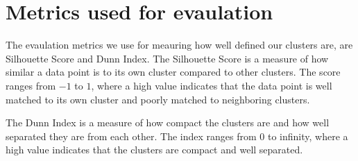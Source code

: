 \section{Metrics used for evaulation}

The evaulation metrics we use for meauring how well defined our clusters are, are Silhouette Score and Dunn Index. The Silhouette Score is a measure of how similar a data point is to its own cluster compared to other clusters. The score ranges from $-1$ to $1$, where a high value indicates that the data point is well matched to its own cluster and poorly matched to neighboring clusters. 
\par
The Dunn Index is a measure of how compact the clusters are and how well separated they are from each other. The index ranges from $0$ to infinity, where a high value indicates that the clusters are compact and well separated.